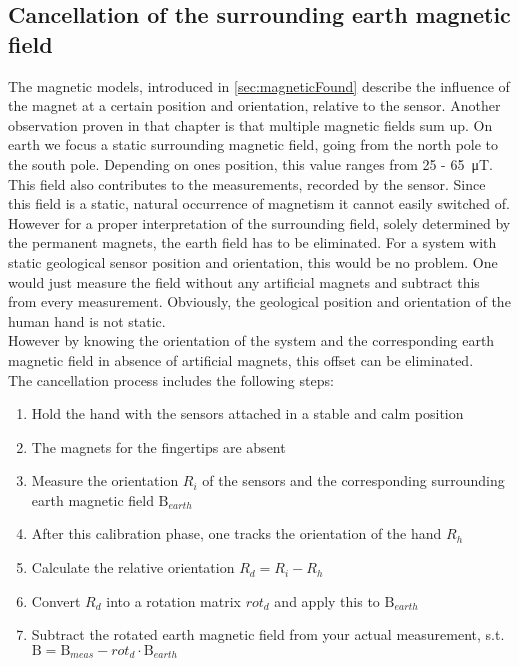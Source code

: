 \subsection{Cancellation of the surrounding earth magnetic field}

The magnetic models, introduced in \ref{sec:magneticFound} describe the influence of the magnet at a certain position and orientation, relative to the sensor. Another observation proven in that chapter is that multiple magnetic fields sum up. On earth we focus a static surrounding magnetic field, going from the north pole to the south pole. Depending on ones position, this value ranges from 25 - \SI{65}{\micro \tesla}. This field also contributes to the measurements, recorded by the sensor. Since this field is a static, natural occurrence of magnetism it cannot easily switched of. However for a proper interpretation of the surrounding field, solely determined by the permanent magnets, the earth field has to be eliminated. For a system with static geological sensor position and orientation, this would be no problem. One would just measure the field without any artificial magnets and subtract this from every measurement. Obviously, the geological position and orientation of the human hand is not static.\\
However by knowing the orientation of the system and the corresponding earth magnetic field in absence of artificial magnets, this offset can be eliminated.\\
The cancellation process includes the following steps:\\
\begin{enumerate}
\item Hold the hand with the sensors attached in a stable and calm position
\item The magnets for the fingertips are absent
\item Measure the orientation $ R_{i} $ of the sensors and the corresponding surrounding earth magnetic field $ \mathrm{B}_{earth} $
\item After this calibration phase, one tracks the orientation of the hand $ R_{h} $
\item Calculate the relative orientation $ R_{d} = R_{i} - R_{h} $
\item Convert $ R_{d} $ into a rotation matrix $ rot_{d} $ and apply this to $ \mathrm{B}_{earth} $
\item Subtract the rotated earth magnetic field from your actual measurement, s.t. \\ $ \mathrm{B} = \mathrm{B}_{meas} - rot_{d} \cdot \mathrm{B}_{earth} $
\end{enumerate}
